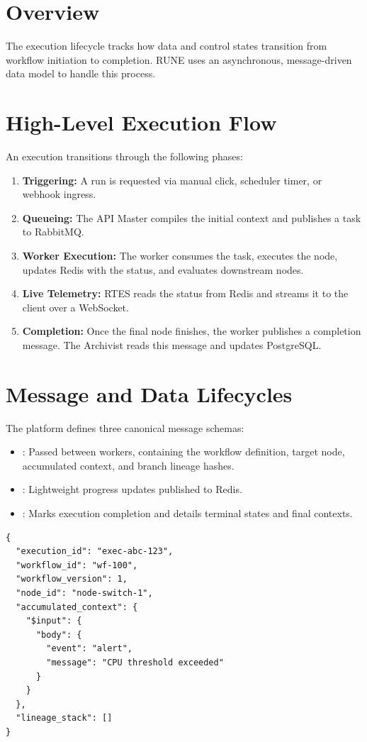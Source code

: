 \documentclass[12pt]{report}
\begin{document}
\section{Overview}
The execution lifecycle tracks how data and control states transition from workflow initiation to completion. RUNE uses an asynchronous, message-driven data model to handle this process.

\section{High-Level Execution Flow}
An execution transitions through the following phases:
\begin{enumerate}
    \item \textbf{Triggering:} A run is requested via manual click, scheduler timer, or webhook ingress.
    \item \textbf{Queueing:} The API Master compiles the initial context and publishes a task to RabbitMQ.
    \item \textbf{Worker Execution:} The worker consumes the task, executes the node, updates Redis with the status, and evaluates downstream nodes.
    \item \textbf{Live Telemetry:} RTES reads the status from Redis and streams it to the client over a WebSocket.
    \item \textbf{Completion:} Once the final node finishes, the worker publishes a completion message. The Archivist reads this message and updates PostgreSQL.
\end{enumerate}

\section{Message and Data Lifecycles}
The platform defines three canonical message schemas:
\begin{itemize}
    \item {}: Passed between workers, containing the workflow definition, target node, accumulated context, and branch lineage hashes.
    \item {}: Lightweight progress updates published to Redis.
    \item {}: Marks execution completion and details terminal states and final contexts.
\end{itemize}

\begin{lstlisting}[language={}, caption=NodeExecutionMessage JSON Payload Example]
{
  "execution_id": "exec-abc-123",
  "workflow_id": "wf-100",
  "workflow_version": 1,
  "node_id": "node-switch-1",
  "accumulated_context": {
    "$input": {
      "body": {
        "event": "alert",
        "message": "CPU threshold exceeded"
      }
    }
  },
  "lineage_stack": []
}
\end{lstlisting}
\end{document}

